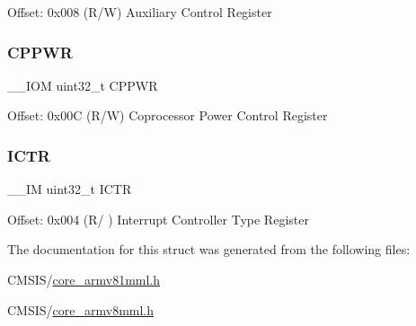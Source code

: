 Offset\+: 0x008 (R/W) Auxiliary Control Register \mbox{\label{struct_s_cn_s_c_b___type_a6236035fc90059a599910d9cb9299ff0}} 
\subsubsection{\texorpdfstring{CPPWR}{CPPWR}}
{\footnotesize\ttfamily \+\_\+\+\_\+\+I\+OM uint32\+\_\+t C\+P\+P\+WR}

Offset\+: 0x00C (R/W) Coprocessor Power Control Register \mbox{\label{struct_s_cn_s_c_b___type_acf9b76331abd768af25a10b3625da4b4}} 
\subsubsection{\texorpdfstring{ICTR}{ICTR}}
{\footnotesize\ttfamily \+\_\+\+\_\+\+IM uint32\+\_\+t I\+C\+TR}

Offset\+: 0x004 (R/ ) Interrupt Controller Type Register 

The documentation for this struct was generated from the following files\+:\begin{DoxyCompactItemize}
\item 
C\+M\+S\+I\+S/\mbox{\hyperlink{core__armv81mml_8h}{core\+\_\+armv81mml.\+h}}\item 
C\+M\+S\+I\+S/\mbox{\hyperlink{core__armv8mml_8h}{core\+\_\+armv8mml.\+h}}\end{DoxyCompactItemize}
